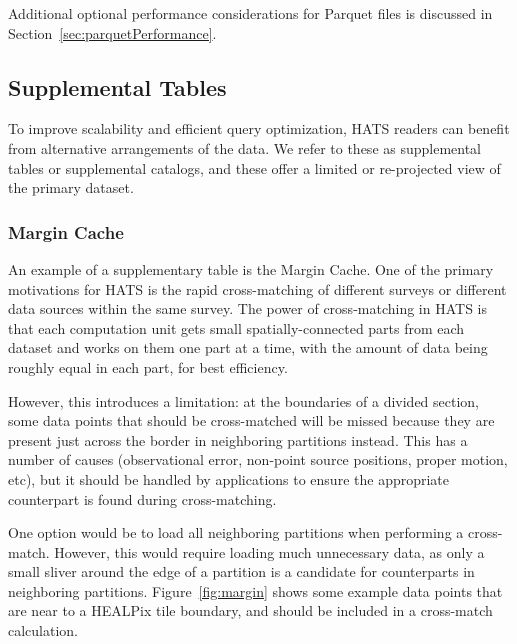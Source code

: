 \documentclass[11pt,a4paper]{ivoa}
\begin{document}
Additional optional performance considerations for Parquet files is discussed in Section~\ref{sec:parquetPerformance}.

\subsection{Supplemental Tables} \label{sec:supplemental}

To improve scalability and efficient query optimization, HATS readers can benefit from alternative arrangements of the data. 
We refer to these as supplemental tables or supplemental catalogs, and these offer a limited or re-projected view of the primary dataset.

\subsubsection{Margin Cache} \label{sec:margin}

An example of a supplementary table is the Margin Cache. One of the primary motivations for HATS is the rapid cross-matching of different surveys or different data sources within the same survey. 
The power of cross-matching in HATS is that each computation unit gets small spatially-connected parts from each dataset and works on them one part at a time,
with the amount of data being roughly equal in each part, for best efficiency.\par 

However, this introduces a limitation: at the boundaries of a divided section, some data points that should be cross-matched will be missed because they are present just across the border in neighboring partitions instead.
This has a number of causes (observational error, non-point source positions, proper motion, etc), but it should be handled by applications to ensure the appropriate counterpart is found during cross-matching.\par

One option would be to load all neighboring partitions when performing a cross-match. 
However, this would require loading much unnecessary data, as only a small sliver around the edge of a partition is a candidate for counterparts in neighboring partitions. 
Figure~\ref{fig:margin} shows some example data points that are near to a HEALPix tile boundary, and should be included in a cross-match calculation.
\end{document}

